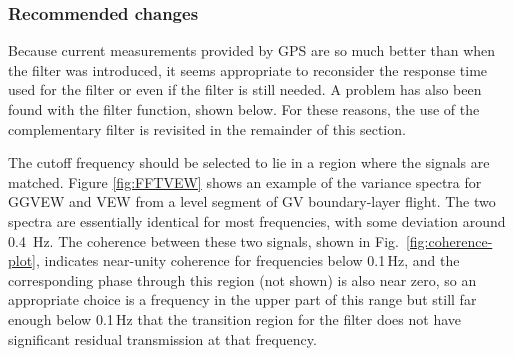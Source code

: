 \documentclass[12pt,twoside,english]{article}\usepackage[]{graphicx}\usepackage[]{color}
\begin{document}
{{\subsubsection{Recommended changes}

Because current measurements provided by GPS are so much better than when the filter was introduced, it seems appropriate to reconsider the response time used for the filter or even if the filter is still needed. A problem has also been found with the filter function, shown below. For these reasons, the use of the complementary filter is revisited in the remainder of this section.

The cutoff frequency should be selected to lie in a region where the signals are matched. Figure \ref{fig:FFTVEW} shows an example of the variance spectra for GGVEW and VEW from a level segment of GV boundary-layer flight. The two spectra
are essentially identical for most frequencies, with some deviation around 0.4~Hz. The coherence between these two signals, shown in Fig.~\ref{fig:coherence-plot}, indicates near-unity coherence for frequencies below 0.1\,Hz, and the corresponding phase through this region (not shown) is also near zero, so an appropriate choice is a frequency in the upper part of this range but still far enough below 0.1\,Hz that the transition region for the filter does not have significant residual transmission at that frequency.

}}
\end{document}
